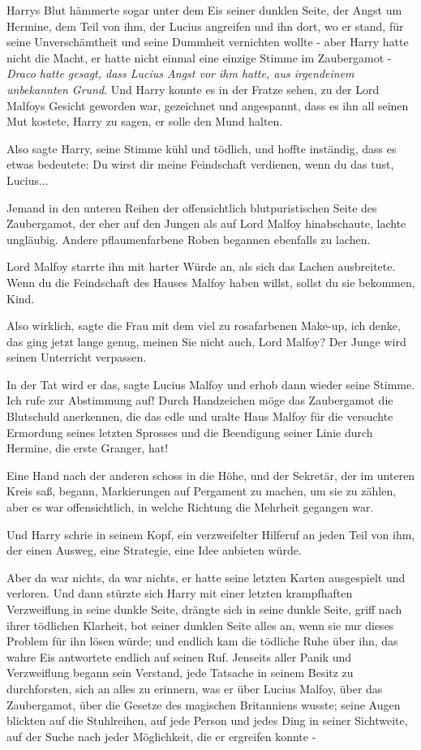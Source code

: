Harrys Blut hämmerte sogar unter dem Eis seiner dunklen Seite, der Angst um
Hermine, dem Teil von ihm, der Lucius angreifen und ihn dort, wo er stand, für
seine Unverschämtheit und seine Dummheit vernichten wollte - aber Harry hatte
nicht die Macht, er hatte nicht einmal eine einzige Stimme im Zaubergamot -
\emph{Draco hatte gesagt, dass Lucius Angst vor ihm hatte, aus irgendeinem
unbekannten Grund}. Und Harry konnte es in der Fratze sehen, zu der Lord Malfoys
Gesicht geworden war, gezeichnet und angespannt, dass es ihn all seinen Mut
kostete, Harry zu sagen, er solle den Mund halten.

Also sagte Harry, seine Stimme kühl und tödlich, und hoffte inständig, dass es
etwas bedeutete: \glqq Du wirst dir meine Feindschaft verdienen, wenn du das
tust, Lucius...\grqq{}

Jemand in den unteren Reihen der offensichtlich blutpuristischen Seite des
Zaubergamot, der eher auf den Jungen als auf Lord Malfoy hinabschaute, lachte
ungläubig. Andere pflaumenfarbene Roben begannen ebenfalls zu lachen.

Lord Malfoy starrte ihn mit harter Würde an, als sich das Lachen ausbreitete.
\glqq Wenn du die Feindschaft des Hauses Malfoy haben willst, sollst du sie
bekommen, Kind.

\glqq Also wirklich\grqq{}, sagte die Frau mit dem viel zu rosafarbenen Make-up,
\glqq ich denke, das ging jetzt lange genug, meinen Sie nicht auch, Lord Malfoy?
Der Junge wird seinen Unterricht verpassen.\grqq{}

\glqq In der Tat wird er das\grqq{}, sagte Lucius Malfoy und erhob dann wieder
seine Stimme. \glqq Ich rufe zur Abstimmung auf! Durch Handzeichen möge das
Zaubergamot die Blutschuld anerkennen, die das edle und uralte Haus Malfoy für
die versuchte Ermordung seines letzten Sprosses und die Beendigung seiner Linie
durch Hermine, die erste Granger, hat!\grqq{}

Eine Hand nach der anderen schoss in die Höhe, und der Sekretär, der im unteren
Kreis saß, begann, Markierungen auf Pergament zu machen, um sie zu zählen, aber
es war offensichtlich, in welche Richtung die Mehrheit gegangen war.

Und Harry schrie in seinem Kopf, ein verzweifelter Hilferuf an jeden Teil von
ihm, der einen Ausweg, eine Strategie, eine Idee anbieten würde.

Aber da war nichts, da war nichts, er hatte seine letzten Karten ausgespielt und
verloren. Und dann stürzte sich Harry mit einer letzten krampfhaften
Verzweiflung in seine dunkle Seite, drängte sich in seine dunkle Seite, griff
nach ihrer tödlichen Klarheit, bot seiner dunklen Seite alles an, wenn sie nur
dieses Problem für ihn lösen würde; und endlich kam die tödliche Ruhe über ihn,
das wahre Eis antwortete endlich auf seinen Ruf. Jenseits aller Panik und
Verzweiflung begann sein Verstand, jede Tatsache in seinem Besitz zu
durchforsten, sich an alles zu erinnern, was er über Lucius Malfoy, über das
Zaubergamot, über die Gesetze des magischen Britanniens wusste; seine Augen
blickten auf die Stuhlreihen, auf jede Person und jedes Ding in seiner
Sichtweite, auf der Suche nach jeder Möglichkeit, die er ergreifen konnte -

